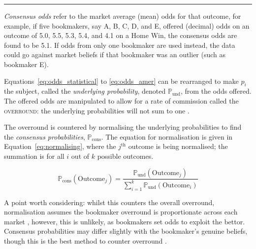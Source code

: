 \documentclass[a4paper,10pt]{report}
\begin{document}
\begin{center}\rule{0.75\textwidth}{0.6pt}\end{center}

\textit{Consensus odds} refer to the market average (mean) odds for that outcome, for example, if five bookmakers, say A, B, C, D, and E, offered (decimal) odds on an outcome of 5.0, 5.5, 5.3, 5.4, and 4.1 on a Home Win, the consensus odds are found to be 5.1. If odds from only one bookmaker are used instead, the data could go against market beliefs if that bookmaker was an outlier (such as bookmaker E). \vspace{3mm}

Equations~\ref{eq:odds_statistical} to \ref{eq:odds_amer} can be rearranged to make $p_i$ the subject, called the \textit{underlying probability}, denoted $\mathbb{P}_{\textrm{und}}$, from the odds offered. The offered odds are manipulated to allow for a rate of commission called the \textsc{overround}: the underlying probabilities will not sum to one \autocite{cortis15, Strumbelj14}.\vspace{3mm}

The overround is countered by normalising the underlying probabilities to find the \textit{consensus probabilities}, $\mathbb{P}_{\textrm{cons}}$. The equation for normalisation is given in Equation~\ref{eq:normalising}, where the $j^{\textrm{th}}$ outcome is being normalised; the summation is for all $i$ out of $k$ possible outcomes.

\begin{equation}\label{eq:normalising}
\mathbb{P}_{\textrm{cons}}(\textrm{Outcome}_j) = 
\frac{ \mathbb{P}_{\textrm{und}}(\textrm{Outcome}_j) }
{\sum^k_{i=1} \mathbb{P}_{\textrm{und}}(\textrm{Outcome}_i)}
\end{equation}

A point worth considering: whilst this counters the overall overround, normalisation assumes the bookmaker overround is proportionate across each market \autocite{angelini19}, however, this is unlikely, as bookmakers set odds to exploit the bettor. Consensus probabilities may differ slightly with the bookmaker's genuine beliefs, though this is the best method to counter overround \autocite{levitt04}.
\end{document}
